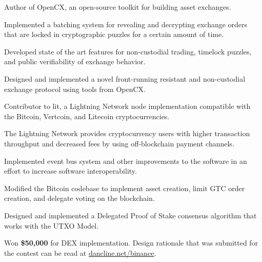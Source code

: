 
\begin{tightemize}
  \item Author of OpenCX, an open-source toolkit for building asset exchanges.
  \item Implemented a batching system for revealing and decrypting exchange orders that are locked in cryptographic puzzles for a certain amount of time.
  \item Developed state of the art features for non-custodial trading,
      timelock puzzles, and public verifiability of exchange behavior.
  \item Designed and implemented a novel front-running resistant and non-custodial exchange protocol using tools from OpenCX.
\end{tightemize}
\subsectionsep

\begin{tightemize}
  \item Contributor to lit, a Lightning Network node implementation compatible with the Bitcoin, Vertcoin, and Litecoin cryptocurrencies.
  \item The Lightning Network provides cryptocurrency users with higher transaction throughput and decreased fees by using off-blockchain payment channels.
  \item Implemented event bus system and other improvements to the software in an effort to increase software interoperability.
\end{tightemize}
\subsectionsep

\begin{tightemize}
  \item Modified the Bitcoin codebase to implement asset creation, limit GTC
    order creation, and delegate voting on the blockchain.
  \item Designed and implemented a Delegated Proof of
      Stake consensus algorithm that works with the UTXO Model.
  \item Won \textbf{\$50,000} for DEX implementation.
    Design rationale that was submitted for the contest can be read at
    \href{https://dancline.net/binance/}{dancline.net/binance}.
\end{tightemize}
